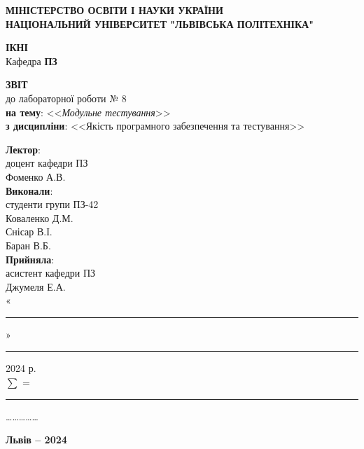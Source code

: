 \documentclass[oneside,14pt]{extarticle}
\newcommand\subject{Якість програмного забезпечення та тестування}
\newcommand\lecturer{доцент кафедри ПЗ\\Фоменко А.В.}
\newcommand\teacher{асистент кафедри ПЗ\\Джумеля Е.А.}
\newcommand\mygroup{ПЗ-42}
\newcommand\lab{8}
\newcommand\theme{Модульне тестування}
\begin{document}
\begin{normalsize}
	\begin{titlepage}
		\thispagestyle{empty}
		\begin{center}
			\textbf{МІНІСТЕРСТВО ОСВІТИ І НАУКИ УКРАЇНИ\\
				НАЦІОНАЛЬНИЙ УНІВЕРСИТЕТ "ЛЬВІВСЬКА ПОЛІТЕХНІКА"}
		\end{center}
		\begin{flushright}
			\textbf{ІКНІ}\\
			Кафедра \textbf{ПЗ}
		\end{flushright}
		\vspace{80pt}
		\begin{center}
			\textbf{ЗВІТ}\\
			\vspace{10pt}
			до лабораторної роботи № \lab\\
			\textbf{на тему}: <<\textit{\theme}>>\\
			\textbf{з дисципліни}: <<\subject>>
		\end{center}
		\vspace{80pt}
		\begin{flushright}
			
			\textbf{Лектор}:\\
			\lecturer\\
			\vspace{28pt}
			\textbf{Виконали}:\\
			
			студенти групи \mygroup\\
			Коваленко Д.М.\\
			Снісар В.І.\\
			Баран В.Б.\\
			\vspace{28pt}
			\textbf{Прийняла}:\\
			
			\teacher\\
			
			\vspace{28pt}
			«\rule{1cm}{0.15mm}» \rule{1.5cm}{0.15mm} 2024 р.\\
			$\sum$ = \rule{1cm}{0.15mm}……………\\
			
		\end{flushright}
		\vspace{\fill}
		\begin{center}
			\textbf{Львів – 2024}
		\end{center}
	\end{titlepage}
		

\end{normalsize}
\end{document}

